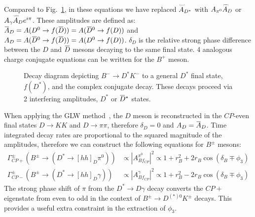 \documentclass[oneside,12pt]{article}
\newcommand{\overbar}[1]{\mkern 1.5mu\overline{\mkern-1.5mu#1\mkern-1.5mu}\mkern
1.5mu}
\newcommand\brobor{\smash[b]{\raisebox{0.6\height}{\scalebox{0.5}{\tiny(}}{\mkern-1.5mu\scriptstyle-\mkern-1.5mu}\raisebox{0.6\height}{\scalebox{0.5}{\tiny)}}}}
\begin{document}
\noindent Compared to Fig.~\ref{fig:B2DstKDiagram}, in these equations we have
replaced $\accentset{\brobor}{A}\phantom{}_{D^{*}}$ with
$A_{\pi^{0}}\accentset{\brobor}{A}\phantom{}_{D}$ or
$A_{\gamma}\accentset{\brobor}{A}\phantom{}_{D}e^{{i\pi}}$. These amplitudes
are defined as: $\overbar{A}_{D}=A(D^{0}\rightarrow
f(\overbar{D}))=A(\overbar{D}^{0}\rightarrow f(D))$ and
$A_{D}=A(\overbar{D}^{0}\rightarrow f(\overbar{D}))=A(D^{0}\rightarrow f(D))$.
$\delta_D$ is the relative strong phase difference between the $D$ and
$\overbar{D}$ mesons decaying to the same final state. 4 analogous charge
conjugate equations can be written for the $B^{+}$ meson. 
\begin{figure}[H]
  \centering
  \caption{{Decay diagram depicting ${B}^{-}\rightarrow{D}^{*}{K}^{-}$ to
      a general $D^{*}$ final state, $f(D^{*})$, and the complex conjugate decay.
      These decays proceed via 2 interfering amplitudes, $D^{*}$ or 
  $\overbar{D}^{*}$ states.}}
  \label{fig:B2DstKDiagram} \vspace{-10pt}
\end{figure}

When applying the GLW method~\cite{GLWRef}, the $D$ meson is reconstructed in
the $CP$-even final states $D\rightarrow KK$ and $D\rightarrow \pi \pi$,
therefore $\delta_D=0$ and $A_{D}=\overbar{A}_{D}$. Time integrated decay rates
are proportional to the squared magnitude of the amplitudes, therefore we can
construct the following equations for $B^{\pm}$ mesons:
\begin{align}
  \Gamma_{CP+}^{\pm}(B^{\pm}\rightarrow (D^{*}\rightarrow
  [hh]_D\pi^{0}))&\propto |A^{\pi^0}_{Bf_{CP}}|^2 \propto 1 + r_{B}^{2} +
  2r_{B}\cos(\delta_{B}\mp \phi_{3}) \\
  \Gamma_{CP-}^{\pm}(B^{\pm}\rightarrow (D^{*}\rightarrow
  [hh]_D\gamma))&\propto |A^{\gamma}_{Bf_{CP}}|^2 \propto 1 + r_{B}^{2} -
  2r_{B}\cos(\delta_{B}\mp \phi_{3})
\end{align}
\noindent The strong phase shift of $\pi$ from the
$D^{*}\rightarrow D\gamma$ decay converts the $CP+$ eigenstate from even to odd
in the context of $B^{\pm}\rightarrow D^{(*)0}K^{\pm}$ decays. This provides a
useful extra constraint in the extraction of $\phi_3$. 
\end{document}
